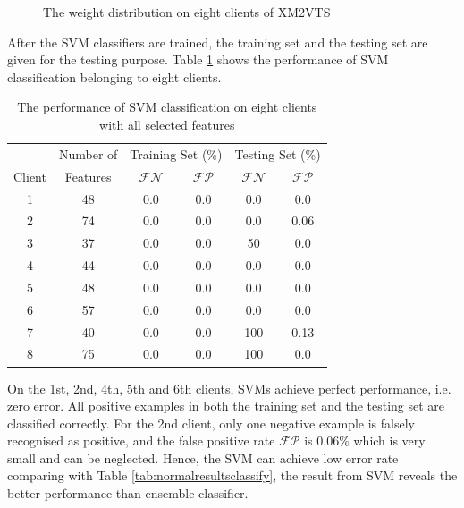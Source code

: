 \documentclass[a4paper,10pt]{article}
\begin{document}
\begin{figure}
\begin{center}
\end{center}
 \caption{The weight distribution on eight clients of XM2VTS}
\label{fig:weightdistc1toc8}
\end{figure} 

After the SVM classifiers are trained, the training set and the testing set are given for the testing purpose. \mbox{Table} \ref{tab:svmevaluation} shows the performance of SVM classification belonging to eight clients.
\begin{table}[ht]
\caption{The performance of SVM classification on eight clients with all selected features}
 \begin{center}
   \begin{tabular}{|c|c|c|c|c|c|}
  \hline
    & Number of &\multicolumn{2}{c|}{Training Set (\%)} & \multicolumn{2}{c|}{Testing Set (\%)}\\
   \cline{3-6}
  Client & Features &$\mathcal{FN}$ & $\mathcal{FP}$ & $\mathcal{FN}$ & $\mathcal{FP}$ \\
  \hline
  1 & 48 & 0.0 & 0.0 & 0.0 & 0.0\\
  2 & 74 & 0.0 & 0.0 & 0.0 & 0.06\\
  3 & 37 & 0.0 & 0.0 & 50 & 0.0\\
  4 & 44 & 0.0 & 0.0 & 0.0 & 0.0\\
  5 & 48 & 0.0 & 0.0 & 0.0 & 0.0\\
  6 & 57 & 0.0 & 0.0 & 0.0 & 0.0\\
  7 & 40 & 0.0 & 0.0 & 100 & 0.13\\
  8 & 75 & 0.0 & 0.0 & 100 & 0.0\\
  \hline
 \end{tabular}
 \end{center}
\label{tab:svmevaluation}
\end{table} 
On the 1st, 2nd, 4th, 5th and 6th clients, SVMs achieve perfect performance, i.e. zero error. All positive examples in both the training set and the testing set are classified correctly. For the 2nd client, only one negative example is falsely recognised as positive, and the false positive rate $\mathcal{FP}$ is $0.06\%$ which is very small and can be neglected. Hence, the SVM can achieve low error rate comparing with \mbox{Table} \ref{tab:normalresultsclassify}, the result from SVM reveals the better performance than ensemble classifier.
\end{document}
